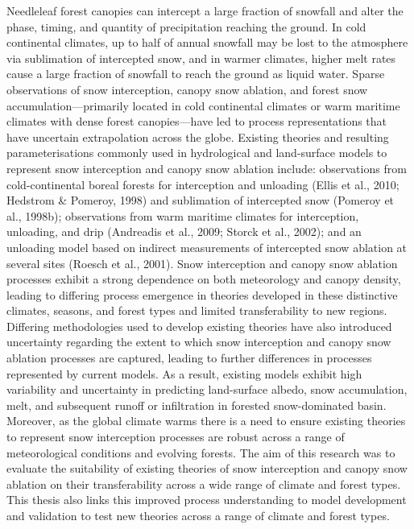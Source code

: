 \documentclass[
  letterpaper,
]{tex/uofsthesis-cs}
\begin{document}
Needleleaf forest canopies can intercept a large fraction of snowfall
and alter the phase, timing, and quantity of precipitation reaching the
ground. In cold continental climates, up to half of annual snowfall may
be lost to the atmosphere via sublimation of intercepted snow, and in
warmer climates, higher melt rates cause a large fraction of snowfall to
reach the ground as liquid water. Sparse observations of snow
interception, canopy snow ablation, and forest snow
accumulation---primarily located in cold continental climates or warm
maritime climates with dense forest canopies---have led to process
representations that have uncertain extrapolation across the globe.
Existing theories and resulting parameterisations commonly used in
hydrological and land-surface models to represent snow interception and
canopy snow ablation include: observations from cold-continental boreal
forests for interception and unloading (Ellis et al., 2010; Hedstrom \&
Pomeroy, 1998) and sublimation of intercepted snow (Pomeroy et al.,
1998b); observations from warm maritime climates for interception,
unloading, and drip (Andreadis et al., 2009; Storck et al., 2002); and
an unloading model based on indirect measurements of intercepted snow
ablation at several sites (Roesch et al., 2001). Snow interception and
canopy snow ablation processes exhibit a strong dependence on both
meteorology and canopy density, leading to differing process emergence
in theories developed in these distinctive climates, seasons, and forest
types and limited transferability to new regions. Differing
methodologies used to develop existing theories have also introduced
uncertainty regarding the extent to which snow interception and canopy
snow ablation processes are captured, leading to further differences in
processes represented by current models. As a result, existing models
exhibit high variability and uncertainty in predicting land-surface
albedo, snow accumulation, melt, and subsequent runoff or infiltration
in forested snow-dominated basin. Moreover, as the global climate warms
there is a need to ensure existing theories to represent snow
interception processes are robust across a range of meteorological
conditions and evolving forests. The aim of this research was to
evaluate the suitability of existing theories of snow interception and
canopy snow ablation on their transferability across a wide range of
climate and forest types. This thesis also links this improved process
understanding to model development and validation to test new theories
across a range of climate and forest types.
\end{document}
